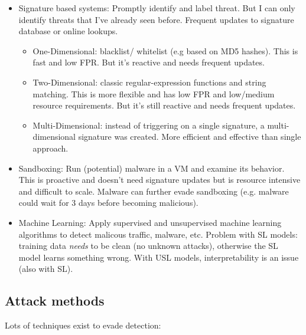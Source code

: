 \documentclass[11pt,oneside,a4paper]{article}
\begin{document}
\vspace{-\topsep}
\begin{itemize}
	\setlength{\itemsep}{0pt}
	\setlength{\parskip}{0pt}
	\item Signature based systems: Promptly identify and label threat. But I can only identify threats that I've already seen before. Frequent updates to signature database or online lookups.
	\begin{itemize}
		\item One-Dimensional: blacklist/ whitelist (e.g based on MD5 hashes). This is fast and low FPR. But it's reactive and needs frequent updates.
		\item Two-Dimensional: classic regular-expression functions and string matching. This is more flexible and has low FPR and low/medium resource requirements. But it's still reactive and needs frequent updates.
		\item Multi-Dimensional: instead of triggering on a single signature, a	multi-dimensional signature was created. More efficient and effective than single approach.
	\end{itemize}
	\item Sandboxing: Run (potential) malware in a VM and examine its behavior. This is proactive and doesn't need signature updates but is resource intensive and difficult to scale. Malware can further evade sandboxing (e.g. malware could wait for 3 days before becoming malicious).
	\item Machine Learning: Apply supervised and unsupervised machine learning algorithms to detect malicous traffic, malware, etc. Problem with SL models: training data \textit{needs} to be clean (no unknown attacks), otherwise the SL model learns something wrong. With USL models, interpretability is an issue (also with SL).
\end{itemize}
\vspace{-\topsep}

\subsection{Attack methods}

Lots of techniques exist to evade detection:
\end{document}
